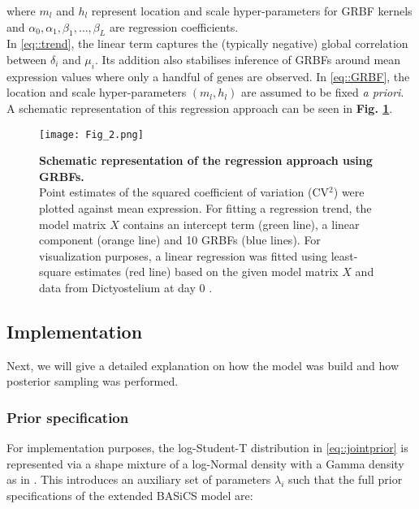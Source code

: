 where $m_l$ and $h_l$ represent location and scale hyper-parameters for GRBF kernels and $\alpha_0, \alpha_1, \beta_1, \ldots, \beta_L$ are regression coefficients. \\

In \eqref{eq::trend}, the linear term captures the (typically negative) global correlation between $\delta_i$ and $\mu_i$. Its addition also stabilises inference of GRBFs around mean expression values where only a handful of genes are observed. In \eqref{eq::GRBF}, the location and scale hyper-parameters $(m_l, h_l)$ are assumed to be fixed \emph{a priori}. A schematic representation of this regression approach can be seen in \textbf{Fig. \ref{fig2:GRBFs}}.

\begin{figure}[!h]
\centering
\texttt{[image: Fig\_2.png]}
\caption[Schematic representation of the regression approach using GRBFs]{\textbf{Schematic representation of the regression approach using GRBFs.}\\
Point estimates of the squared coefficient of variation (CV$^2$) were plotted against mean expression. For fitting a regression trend, the model matrix $X$ contains an intercept term (green line), a linear component (orange line) and 10 GRBFs (blue lines). For visualization purposes, a linear regression was fitted using least-square estimates (red line) based on the given model matrix $X$ and data from Dictyostelium at day 0 \citep{Antolovic2017}.}
\label{fig2:GRBFs}
\end{figure}


\subsection{Implementation}

Next, we will give a detailed explanation on how the model was build and how posterior sampling was performed.  


\subsubsection{Prior specification}

For implementation purposes, the log-Student-T distribution in \ref{eq::jointprior} is represented via a shape mixture of a log-Normal density with a Gamma density as in \cite{Vallejos2015}. This introduces an auxiliary set of parameters $\lambda_i$ such that the full prior specifications of the extended BASiCS model are:

